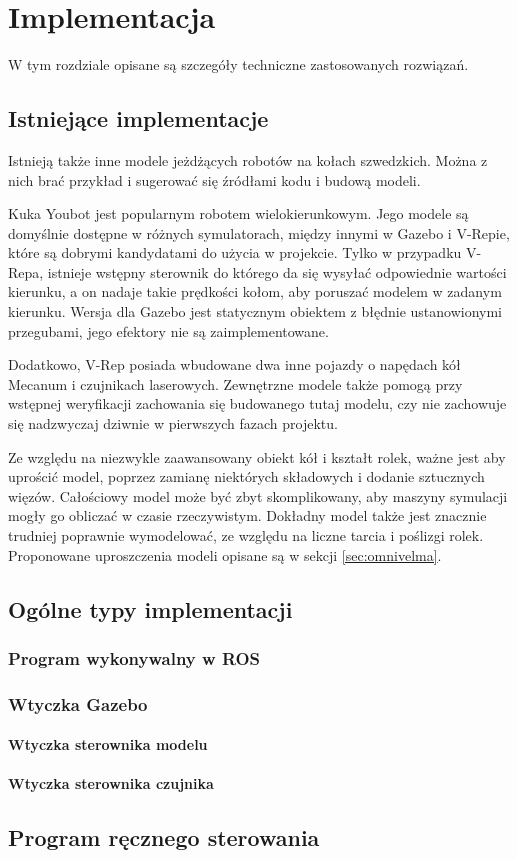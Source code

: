 \chapter{Implementacja} 
\label{sec:implementation}
W tym rozdziale opisane są szczegóły techniczne zastosowanych rozwiązań.

\section{Istniejące implementacje}
	Istnieją także inne modele jeżdżących robotów na kołach szwedzkich.
	Można z nich brać przykład i sugerować się źródłami kodu i budową modeli.

	Kuka Youbot jest popularnym robotem wielokierunkowym. Jego modele są domyślnie dostępne w różnych symulatorach, między innymi w Gazebo i V-Repie, które są dobrymi kandydatami do 
	użycia w projekcie.
	Tylko w przypadku V-Repa, istnieje wstępny sterownik do którego da się wysyłać odpowiednie wartości kierunku, a on nadaje takie prędkości kołom, aby poruszać modelem w zadanym kierunku.
	Wersja dla Gazebo jest statycznym obiektem z błędnie ustanowionymi przegubami, jego efektory nie są zaimplementowane.
	
	Dodatkowo, V-Rep posiada wbudowane dwa inne pojazdy o napędach kół Mecanum i czujnikach laserowych.
	Zewnętrzne modele także pomogą przy wstępnej weryfikacji zachowania się budowanego tutaj modelu, czy nie zachowuje się nadzwyczaj dziwnie w pierwszych fazach projektu.

	Ze względu na niezwykle zaawansowany obiekt kół i kształt rolek, ważne jest aby uprościć model, poprzez zamianę niektórych składowych i dodanie sztucznych więzów.
	Całościowy model może być zbyt skomplikowany, aby maszyny symulacji mogły go obliczać w czasie rzeczywistym.
	Dokładny model także jest znacznie trudniej poprawnie wymodelować, ze względu na liczne tarcia i poślizgi rolek.
	Proponowane uproszczenia modeli opisane są w sekcji \ref{sec:omnivelma}.
	

\section{Ogólne typy implementacji}
	\subsection{Program wykonywalny w ROS}

	\subsection{Wtyczka Gazebo}
		\subsubsection{Wtyczka sterownika modelu}
		\subsubsection{Wtyczka sterownika czujnika}
	
\section{Program ręcznego sterowania}


